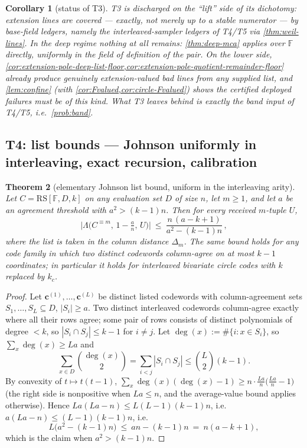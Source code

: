 \documentclass[11pt]{article}
\newtheorem{theorem}{Theorem}[section]
\newtheorem{corollary}[theorem]{Corollary}
\theoremstyle{definition}
\theoremstyle{remark}
\newcommand{\F}{\mathbb{F}}
\newcommand{\RS}{\mathrm{RS}}
\newcommand{\dist}{\Delta}
\newcommand{\Lst}{\Lambda}
\begin{document}
\begin{corollary}[status of T3]\label{cor:T3-status}
T3 is discharged on the ``lift'' side of its dichotomy: extension lines are covered --- exactly, not merely up to a stable numerator --- by base-field ledgers, namely the interleaved-sampler ledgers of T4/T5 via \cref{thm:weil-lines}. In the deep regime nothing at all remains: \cref{thm:deep-mca} applies over $\F$ directly, uniformly in the field of definition of the pair. On the lower side, \cref{cor:extension-pole-deep-list-floor,cor:extension-pole-quotient-remainder-floor} already produce genuinely extension-valued bad lines from any supplied list, and \cref{lem:confine} \textup(with \cref{cor:Fvalued,cor:circle-Fvalued}\textup) shows the certified deployed failures must be of this kind. What T3 leaves behind is exactly the band input of T4/T5, i.e.\ \cref{prob:band}.
\end{corollary}
\subsection{T4: list bounds --- Johnson uniformly in interleaving, exact recursion, calibration}\label{sec:discharge-T4}

\begin{theorem}[elementary Johnson list bound, uniform in the interleaving arity]\label{thm:johnson-list}
Let $C=\RS[\F,D,k]$ on any evaluation set $D$ of size $n$, let $m\ge1$, and let $a$ be an agreement threshold with $a^2>(k-1)n$. Then for every received $m$-tuple $U$,
\[
\bigl|\Lst\bigl(C^{\equiv m},\,1-\tfrac an,\,U\bigr)\bigr|
\ \le\
\frac{n\,(a-k+1)}{a^2-(k-1)n}\,,
\]
where the list is taken in the column distance $\dist_m$. The same bound holds for any code family in which two distinct codewords column-agree on at most $k-1$ coordinates; in particular it holds for interleaved bivariate circle codes with $k$ replaced by $k_c$.
\end{theorem}

\begin{proof}
Let $\mathbf c^{(1)},\dots,\mathbf c^{(L)}$ be distinct listed codewords with column-agreement sets $S_1,\dots,S_L\subseteq D$, $|S_i|\ge a$. Two distinct interleaved codewords column-agree exactly where all their rows agree; some pair of rows consists of distinct polynomials of degree $<k$, so $|S_i\cap S_j|\le k-1$ for $i\ne j$. Let $\deg(x):=\#\{i:x\in S_i\}$, so $\sum_x\deg(x)\ge La$ and
\[
\sum_{x\in D}\binom{\deg(x)}2=\sum_{i<j}|S_i\cap S_j|\le\binom L2(k-1).
\]
By convexity of $t\mapsto t(t-1)$, $\sum_x\deg(x)(\deg(x)-1)\ge n\cdot\frac{La}n\bigl(\frac{La}n-1\bigr)$ \textup(the right side is nonpositive when $La\le n$, and the average-value bound applies otherwise\textup). Hence $La(La-n)\le L(L-1)(k-1)n$, i.e.\ $a(La-n)\le(L-1)(k-1)n$, i.e.
\[
L\bigl(a^2-(k-1)n\bigr)\ \le\ an-(k-1)n\ =\ n(a-k+1),
\]
which is the claim when $a^2>(k-1)n$.
\end{proof}
\end{document}
